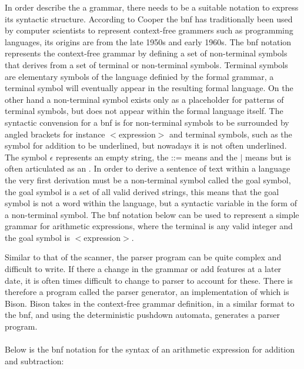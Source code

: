 In order describe the a grammar, there needs to be a suitable notation to express its syntactic structure. According to Cooper the \acrshort{bnf} has traditionally been used by computer scientists to represent context-free grammers such as programming languages, its origins are from the late 1950s and early 1960s. The \acrshort{bnf} notation represents the context-free grammar by defining a set of non-terminal symbols that derives from a set of terminal or non-terminal symbols. Terminal symbols are elementary symbols of the language definied by the formal grammar, a terminal symbol will eventually appear in the resulting formal language. On the other hand a non-terminal symbol exists only as a placeholder for patterns of terminal symbols, but does not appear within the formal language itself. The syntactic convension for a \acrshort{bnf} is for non-terminal symbols to be surrounded by angled brackets for instance $<$expression$>$ and terminal symbols, such as the symbol for addition \say{+} to be underlined, but nowadays it is not often underlined. The symbol $\epsilon$ represents an empty string, the ::= means  and the $\mid$ means  but is often articulated as an  \cite{cooper2011engineering}. In order to derive a sentence of text within a language the very first derivation must be a non-terminal symbol called the goal symbol, the goal symbol is a set of all valid derived strings, this means that the goal symbol is not a word within the language, but a syntactic variable in the form of a non-terminal symbol. The \acrshort{bnf} notation below can be used to represent a simple grammar for arithmetic expressions, where the terminal  is any valid integer and the goal symbol is $<$expression$>$.

Similar to that of the scanner, the parser program can be quite complex and difficult to write. If there a change in the grammar or add features at a later date, it is often times difficult to change to parser to account for these. There is therefore a program called the parser generator, an implementation of which is Bison. Bison takes in the context-free grammar definition, in a similar format to the \acrlong{bnf}, and using the deterministic pushdown automata, generates a parser program.\\
\\
\noindent
Below is the \acrshort{bnf} notation for the syntax of an arithmetic expression for addition and subtraction:
\begin{algorithm}
\begin{bnf*}
		{}\\
		\\
		\\
\end{bnf*}
\end{algorithm}
\FloatBarrier

